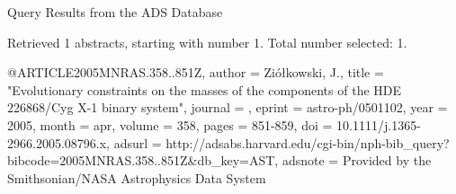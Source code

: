 Query Results from the ADS Database


Retrieved 1 abstracts, starting with number 1.  Total number selected: 1.

@ARTICLE{2005MNRAS.358..851Z,
   author = {{Zi{\'o}{\l}kowski}, J.},
    title = "{Evolutionary constraints on the masses of the components of the HDE 226868/Cyg X-1 binary system}",
  journal = {\mnras},
   eprint = {astro-ph/0501102},
     year = 2005,
    month = apr,
   volume = 358,
    pages = {851-859},
      doi = {10.1111/j.1365-2966.2005.08796.x},
   adsurl = {http://adsabs.harvard.edu/cgi-bin/nph-bib_query?bibcode=2005MNRAS.358..851Z&db_key=AST},
  adsnote = {Provided by the Smithsonian/NASA Astrophysics Data System}
}


